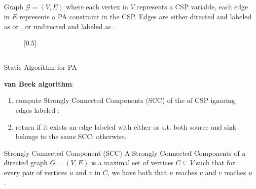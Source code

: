 \subsection{}
\begin{frame}{\tlGraph{}}
	\begin{block}{\tlGraph{}}
		Graph $\mathcal{G} = (V, E)$ where each vertex in $V$ represents a CSP variable, each edge in $E$ represents a PA constraint in the CSP. Edges are either directed and labeled as \sQuote{$\leq$} or \sQuote{$<$}, or undirected and labeled as \sQuote{$\not =$}.
	\end{block}
	
	\begin{figure}
		\centering
	\end{figure}

\end{frame}

\subsection{}
\begin{frame}{Static Algorithm for PA}

	\textbf{van Beek algorithm}:
	\begin{enumerate}
		\item compute Strongly Connected Components (SCC) of the \tlGraph{} of CSP ignoring edges labeled \sQuote{$\not =$};
		\item return  if it exists an edge labeled with either \sQuote{$<$} or \sQuote{$\not =$} s.t. both source and sink belongs to the same SCC;  otherwise.
	\end{enumerate}

	\begin{block}{Strongly Connected Component (SCC)}
		A Strongly Connected Components of a directed graph $G=(V,E)$ is a maximal set of vertices $C \subseteq V$ such that for every pair of vertices $u$ and $v$ in $C$, we have both that $u$ reaches $v$ and $v$ reaches $u$.
	\end{block}	
	
\end{frame}